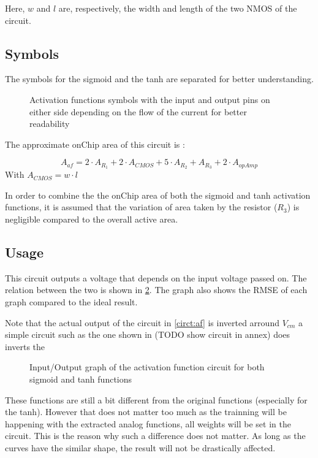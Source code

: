 Here, $w$ and $l$ are, respectively, the width and length of the two NMOS of the circuit.

\subsection{Symbols}

The symbols for the sigmoid and the \ac{tanh} are separated for better understanding.

\begin{figure}[H]
  \centering
  \hspace*{0.8cm}
  \hfill
  \hspace*{0.8cm}
  \caption{Activation functions symbols with the input and output pins on either side depending on the flow of the current for better readability}
  \label{fig:afSymbol}
\end{figure}

The approximate onChip area of this circuit is :

\begin{equation}
  A_{af}=2\cdot A_{R_1} + 2\cdot A_{CMOS} + 5\cdot A_{R_2} + A_{R_3} +2\cdot A_{opAmp}
\end{equation}
With $A_{CMOS} = w\cdot l$

In order to combine the the onChip area of both the sigmoid and \ac{tanh} activation functions, it is assumed that the variation of area taken by the resistor ($R_3$) is negligible compared to the overall active area.

\subsection{Usage}

This circuit outputs a voltage that depends on the input voltage passed on. The relation between the two is shown in \cref{fig:afGraph}. The graph also shows the \ac{RMSE} of each graph compared to the ideal result.

Note that the actual output of the circuit in \cref{circt:af} is inverted arround $V_{cm}$ a simple circuit such as the one shown in  (TODO show circuit in annex) does inverts the

\begin{figure}[H]
  \centering
  
  \caption{Input/Output graph of the activation function circuit for both sigmoid and \acs{tanh} functions}
  \label{fig:afGraph}
\end{figure}

These functions are still a bit different from the original functions (especially for the \ac{tanh}). However that does not matter too much as the trainning will be happening with the extracted analog functions, all weights will be set in the circuit. This is the reason why such a difference does not matter. As long as the curves have the similar shape, the result will not be drastically affected.
